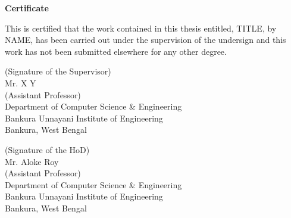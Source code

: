 \documentclass[12pt]{report}
\begin{document}
\newpage
\begin{center}
        \vspace*{1cm}
         \LARGE
        \textbf{Certificate}
        
        \vspace{1.5cm}
 \justify      
		This is certified that the work contained in this thesis entitled, TITLE, by NAME, has been carried out under the supervision of the undersign and this work has not been submitted elsewhere for any other degree.       
        
        \vspace{2.5cm}
        
  \begin{flushleft}
(Signature of the Supervisor)\\
Mr. X Y\\
(Assistant Professor)\\
Department of Computer Science \& Engineering\\
Bankura Unnayani Institute of Engineering\\
Bankura, West Bengal

\vspace{1.5cm}


(Signature of the HoD)\\
Mr. Aloke Roy\\
(Assistant Professor)\\
Department of Computer Science \& Engineering\\
Bankura Unnayani Institute of Engineering\\
Bankura, West Bengal


\end{flushleft}        
      
 
        
        \vfill
        
       
        
        
        
    \end{center}
\newpage
\end{document}
